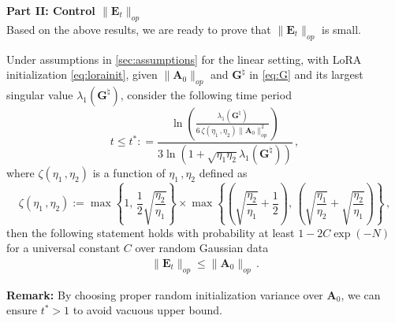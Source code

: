 \noindent
{\bf Part II: Control $\|\bm E_t\|_{op}$}\\

Based on the above results, we are ready to prove that $\|\bm E_t\|_{op}$ is small.
\begin{lemma}\label{E_t_A_0}
Under assumptions in \cref{sec:assumptions} for the linear setting, with LoRA initialization \eqref{eq:lorainit}, given $\| \bm A_0\|_{op}$ and $\bm G^{\natural}$ in \cref{eq:G} and its largest singular value $\lambda_1(\bm G^{\natural})$, 
consider the following time period
\begin{equation*}\label{eq:t*}
t \leq t^* : =\frac{\ln\left(\frac{\lambda_1(\bm G^{\natural})}{6\,\zeta(\eta_1\,,\eta_2) \|\bm A_0\|_{op}^2}\right)}{3\ln\left(1+\sqrt{\eta_1 \eta_2}\lambda_1({\bm G}^{\natural})\right)}\,,  
\end{equation*}
where $\zeta(\eta_1\,,\eta_2)$ is a function of $\eta_1\,,\eta_2$ defined as
\begin{equation}\label{eq:funczeta}
\zeta(\eta_1\,,\eta_2) := \max\left\{1,\,\frac{1}{2}\sqrt{\frac{\eta_2}{\eta_1}}\right\} \times \max\left\{\left(\sqrt{\frac{\eta_2}{\eta_1}} + \frac{1}{2}\right),\,\left(\sqrt{\frac{\eta_1}{\eta_2}}+\sqrt{\frac{\eta_2}{\eta_1}}\right)\right\}\,,  
\end{equation}
then the following statement holds with probability at least $1- 2C\exp(-N)$ for a universal constant $C$ over random Gaussian data
\begin{align}
\label{E_t_A0}
    \|\bm E_t\|_{op} \leq \|\bm A_0\|_{op}\,.
\end{align}
\end{lemma}

\noindent
{\bf Remark:} By choosing proper random initialization variance over $\bm A_0$, we can ensure $t^* > 1$ to avoid vacuous upper bound.

